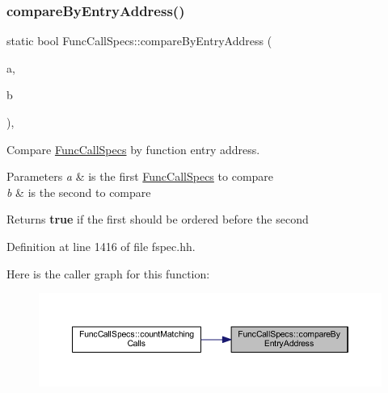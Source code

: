\subsubsection{\texorpdfstring{compareByEntryAddress()}{compareByEntryAddress()}}
{\footnotesize\ttfamily static bool Func\+Call\+Specs\+::compare\+By\+Entry\+Address (\begin{DoxyParamCaption}\item[{const \mbox{\hyperlink{class_func_call_specs}{Func\+Call\+Specs}} $\ast$}]{a,  }\item[{const \mbox{\hyperlink{class_func_call_specs}{Func\+Call\+Specs}} $\ast$}]{b }\end{DoxyParamCaption})\hspace{0.3cm}{\ttfamily [inline]}, {\ttfamily [static]}}



Compare \mbox{\hyperlink{class_func_call_specs}{Func\+Call\+Specs}} by function entry address. 


\begin{DoxyParams}{Parameters}
{\em a} & is the first \mbox{\hyperlink{class_func_call_specs}{Func\+Call\+Specs}} to compare \\
\hline
{\em b} & is the second to compare \\
\hline
\end{DoxyParams}
\begin{DoxyReturn}{Returns}
{\bfseries{true}} if the first should be ordered before the second 
\end{DoxyReturn}


Definition at line 1416 of file fspec.\+hh.

Here is the caller graph for this function\+:
\nopagebreak
\begin{figure}[H]
\begin{center}
\leavevmode
\includegraphics[width=350pt]{class_func_call_specs_a57f3844d92136d3ab6b67ea9ea316aa7_icgraph}
\end{center}
\end{figure}
\mbox{\label{class_func_call_specs_aab6fc72a11289af288ec65f216d7a45b}} 
